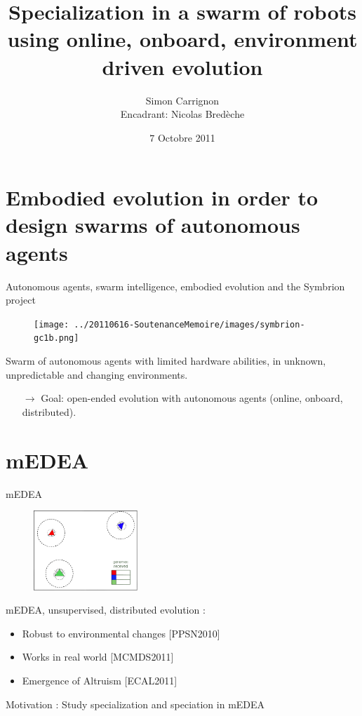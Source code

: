 \documentclass[8pt, handout=show,notes=show]{beamer}
\author[]{Simon Carrignon \\ 
\vfill Encadrant: Nicolas Bred\`{e}che }
\institute[]{
	École~Pratique~des~Hautes~Études, \and TAO/LRI\\
	\pgfdeclareimage[height=0.5cm]{ephe}{../20110616-SoutenanceMemoire/images/logo_ephe_large.jpg} %
	\pgfuseimage{ephe} \hfill \pgfdeclareimage[height=0.5cm]{inria}{../20110616-SoutenanceMemoire/images/taologo.jpg} %
	\pgfuseimage{inria}
	
}
\title{Specialization in a swarm of robots using online, onboard, environment driven evolution}
\date{$7$ Octobre 2011}
\begin{document}
\begin{frame}
\maketitle

\end{frame}
	\newcommand{\imgSize}{4.2cm}

 \section{Embodied evolution in order to design swarms of autonomous agents}
\begin{frame}{Autonomous agents, swarm intelligence, embodied evolution and the Symbrion project}
        \begin{figure}
		\texttt{[image: ../20110616-SoutenanceMemoire/images/symbrion-gc1b.png]}
        \end{figure}
	
	Swarm of autonomous agents with limited hardware abilities, in unknown, unpredictable and changing environments. 
	\begin{itemize}
		\item[$\rightarrow$] Goal: open-ended evolution with autonomous agents (online, onboard, distributed).
	\end{itemize}


\end{frame}
\section{mEDEA}
\begin{frame}{mEDEA }


\begin{figure}
\includegraphics[height=3cm]{images/medea0}
\end{figure}
mEDEA, unsupervised, distributed evolution :
	\begin{itemize}
		\item Robust to environmental changes [PPSN2010] \nocite{bredeche11mcmds} 
		\item Works in real world [MCMDS2011] %
		\item Emergence of Altruism [ECAL2011]
	\end{itemize}

\vfill

Motivation : Study specialization and speciation in mEDEA




\end{frame}
\end{document}
